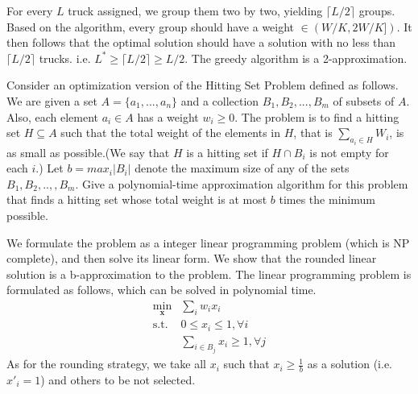 \begin{exercise}[]
\begin{solution}
\begin{enumerate}
      For every $L$ truck assigned, we group them two by two, yielding $\lceil L/2 \rceil$ groups. Based on the algorithm, every group should have a weight $\in (W/K, 2W/K])$. It then follows that the optimal solution should have a solution with no less than $\lceil L/2 \rceil$ trucks. i.e. $L^{*} \ge \lceil L/2 \rceil \ge L/2$. The greedy algorithm is a 2-approximation.  
    \end{enumerate}
  \end{solution}
  \label{ex1}
\end{exercise}


\begin{exercise}[]{Consider an optimization version of the Hitting Set Problem defined as follows. We are given a set $A=\{a_1,...,a_n\}$ and a collection $B_1, B_2, . . . , B_m$ of subsets of $A$. Also, each element $a_i \in A$ has a weight $w_i \geqslant  0$. The problem is to find a hitting set $H \subseteq A$ such that the total weight of the elements in $H$, that is $\sum_{a_i\in H}W_i$, is as small as possible.(We 
    say that $H$ is a hitting set if $H \cap B_i$ is not empty for each $i$.) Let $b = max_i |B_i|$ denote the maximum size of any of the sets $B_1, B_2, ..,, B_m$. Give a polynomial-time approximation algorithm for this problem that finds a hitting set whose total weight is at most $b$ times the minimum possible.
    
    }
  \begin{solution} We formulate the problem as a integer linear programming problem (which is NP complete), and then solve its linear form. We show that the rounded linear solution is a b-approximation to the problem. The linear programming problem is formulated as follows, which can be solved in polynomial time.
    \begin{equation}
      \begin{array}{ll}
        \min_{\mathbf{x}} & \sum_{i} w_i x_i \\
        \text{s.t.} & 0 \le x_{i} \le 1, \forall i \\
        & \sum_{i \in B_j} x_{i} \ge 1 , \forall j
      \end{array}
    \end{equation}
  As for the rounding strategy, we take all $x_i$ such that $x_i \ge \frac{1}{b}$ as a solution (i.e. $x'_i = 1$) and others to be not selected.


\end{solution}
\end{exercise}
